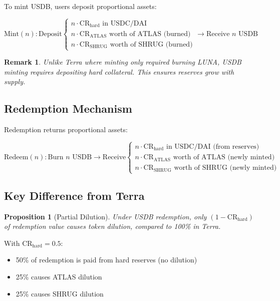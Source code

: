 \documentclass[11pt,a4paper]{article}
\newtheorem{proposition}[theorem]{Proposition}
\newtheorem{remark}[theorem]{Remark}
\begin{document}
To mint USDB, users deposit proportional assets:

\begin{equation}
\text{Mint}(n): \text{Deposit} \begin{cases}
n \cdot \text{CR}_{\text{hard}} \text{ in USDC/DAI} \\
n \cdot \text{CR}_{\text{ATLAS}} \text{ worth of ATLAS (burned)} \\
n \cdot \text{CR}_{\text{SHRUG}} \text{ worth of SHRUG (burned)}
\end{cases} \to \text{Receive } n \text{ USDB}
\end{equation}

\begin{remark}
Unlike Terra where minting only required burning LUNA, USDB minting requires depositing hard collateral. This ensures reserves grow with supply.
\end{remark}

\subsection{Redemption Mechanism}

Redemption returns proportional assets:

\begin{equation}
\text{Redeem}(n): \text{Burn } n \text{ USDB} \to \text{Receive} \begin{cases}
n \cdot \text{CR}_{\text{hard}} \text{ in USDC/DAI (from reserves)} \\
n \cdot \text{CR}_{\text{ATLAS}} \text{ worth of ATLAS (newly minted)} \\
n \cdot \text{CR}_{\text{SHRUG}} \text{ worth of SHRUG (newly minted)}
\end{cases}
\end{equation}

\subsection{Key Difference from Terra}

\begin{proposition}[Partial Dilution]
Under USDB redemption, only $(1 - \text{CR}_{\text{hard}})$ of redemption value causes token dilution, compared to 100\% in Terra.
\end{proposition}

With $\text{CR}_{\text{hard}} = 0.5$:
\begin{itemize}
    \item 50\% of redemption is paid from hard reserves (no dilution)
    \item 25\% causes ATLAS dilution
    \item 25\% causes SHRUG dilution
\end{itemize}
\end{document}
